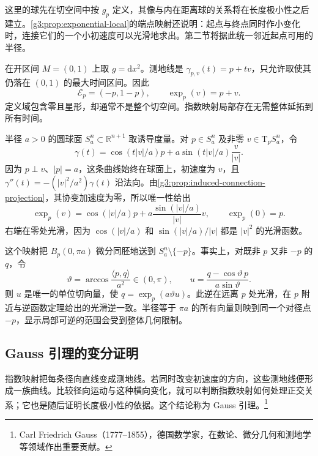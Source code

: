 这里的球先在切空间中按 \(g_p\) 定义，其像与内在距离球的关系将在长度极小性之后建立。\cref{g3:prop:exponential-local}的端点映射还说明：起点与终点同时作小变化时，连接它们的一个小初速度可以光滑地求出。第二节将据此统一邻近起点可用的半径。

\begin{example}\label{g3:exm:interval-exponential-domain}
	在开区间 \(M=(0,1)\) 上取 \(g=\mathrm{d}x^2\)。测地线是 \(\gamma_{p,v}(t)=p+tv\)，只允许取使其仍落在 \((0,1)\) 的最大时间区间。因此
	\[
		\mathcal E_p=(-p,1-p),\qquad \exp_p(v)=p+v.
	\]
	定义域包含零且星形，却通常不是整个切空间。指数映射局部存在无需整体延拓到所有时间。
\end{example}

\begin{example}\label{g3:exm:round-sphere-exponential}
	半径 \(a>0\) 的圆球面 \(S_a^n\subset\mathbb R^{n+1}\) 取诱导度量。对 \(p\in S_a^n\) 及非零 \(v\in\mathrm{T}_pS_a^n\)，令
	\[
		\gamma(t)=\cos(t|v|/a)p
		+a\sin(t|v|/a)\frac{v}{|v|}.
	\]
	因为 \(p\perp v\)、\(|p|=a\)，这条曲线始终在球面上，初速度为 \(v\)，且 \(\gamma''(t)=-(|v|^2/a^2)\gamma(t)\) 沿法向。由\cref{g3:prop:induced-connection-projection}，其协变加速度为零，所以唯一性给出
	\begin{equation}\label{g3:eq:round-sphere-exponential}
		\exp_p(v)=\cos(|v|/a)p
		+a\frac{\sin(|v|/a)}{|v|}v,
		\qquad \exp_p(0)=p.
	\end{equation}
	右端在零处光滑，因为 \(\cos(|v|/a)\) 和 \(\sin(|v|/a)/|v|\) 都是 \(|v|^2\) 的光滑函数。

	这个映射把 \(B_p(0,\pi a)\) 微分同胚地送到 \(S_a^n\setminus\{-p\}\)。事实上，对既非 \(p\) 又非 \(-p\) 的 \(q\)，令
	\[
		\vartheta=\arccos\frac{\langle p,q\rangle}{a^2}\in(0,\pi),
		\qquad
		u=\frac{q-\cos\vartheta\,p}{a\sin\vartheta}.
	\]
	则 \(u\) 是唯一的单位切向量，使 \(q=\exp_p(a\vartheta u)\)。此逆在远离 \(p\) 处光滑，在 \(p\) 附近与逆函数定理给出的光滑逆一致。半径等于 \(\pi a\) 的所有向量则映到同一个对径点 \(-p\)，显示局部可逆的范围会受到整体几何限制。
\end{example}

\subsection{Gauss 引理的变分证明}
\label{g3:subsec:0201:03}

指数映射把每条径向直线变成测地线。若同时改变初速度的方向，这些测地线便形成一族曲线。比较径向运动与这种横向变化，就可以判断指数映射如何处理正交关系；它也是随后证明长度极小性的依据。这个结论称为 Gauss 引理。\footnote{Carl Friedrich Gauss（1777--1855），德国数学家，在数论、微分几何和测地学等领域作出重要贡献。}

